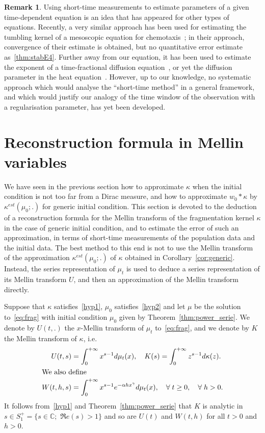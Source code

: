 \documentclass[10pt]{amsart}
\theoremstyle{definition}\newtheorem{defi}[theo]{Definition}\newtheorem{rema}[theo]{Remark}\newtheorem{exam}[theo]{Example}\newtheorem{exem}[theo]{Example}\newtheorem{nota}[theo]{Notation}
\newcommand*\dst{\displaystyle}
\newcommand*\C{\mathbb{C}}
\let\oldforall\forall
\renewcommand*{\forall}{\mathrel{\oldforall}}
\begin{document}
\begin{rema}
Using short-time measurements to estimate parameters of a given time-dependent equation is an idea that has appeared for other types of equations. Recently, a very similar approach has been used for estimating the tumbling kernel of a mesoscopic equation for chemotaxis~\cite{hellmuth2022kinetic}; in their approach, convergence of their estimate is obtained, but no quantitative error estimate as~\eqref{thm:stabE4}. Further away from our equation, it has been used to estimate the exponent of a time-fractional diffusion equation~\cite{li2019inverse}, or yet the diffusion parameter in the heat equation~\cite{cao2006natural}. However, up to our knowledge, no systematic approach which would analyse the ``short-time method'' in a general framework, and which would justify our analogy of the time window of the observation with a regularisation parameter, has yet been developed.
\end{rema}



\section{Reconstruction formula in Mellin variables}\label{sec:reco}
We have seen in the previous section how to approximate $\kappa$ when the initial condition is not too far from a Dirac measure, and how to approximate $w_0 * \kappa$ by $\kappa^{est}(\mu _0;.)$ for generic initial condition. This section is devoted to the deduction of a reconstruction formula for the Mellin transform of the fragmentation kernel $\kappa$ in the case of generic initial condition, and to estimate the error of such an approximation, in terms of short-time measurements of the population data and the initial data. The best method to this end is not to use the Mellin transform of the approximation $\kappa^{est}(\mu_0;.)$ of $\kappa$ obtained in Corollary~\ref{cor:generic}. Instead, the series representation of $\mu_t$ is used to deduce a series representation of its Mellin transform $U$, and then an approximation of the Mellin transform directly.

Suppose that $\kappa $ satisfies~\eqref{hyp1}, $\mu _0$ satisfies~\eqref{hyp2} and let $\mu $ be the solution to~\eqref{eq:frag} with initial condition $\mu_0$ given by Theorem~\ref{thm:power_serie}. We denote by $U(t,.)$ the $x$-Mellin transform of $\mu_t$ to~\eqref{eq:frag}, and we denote by $K$ the Mellin transform of $\kappa$, i.e.
\begin{align*}
U(t,s) &= \dst\int_0^{+\infty} x^{s-1} d\mu_t(x), \quad K(s)= \dst\int_0^{+\infty} z^{s-1} d\kappa(z).
\\
\intertext{We also define}
W(t,h,s) &= \dst\int_0^{+\infty} x^{s-1}e^{-\alpha h x^{\gamma}} d\mu_t(x),\quad\forall t\geq0,\quad\forall h> 0.
\end{align*}
It follows from~\eqref{hyp1} and Theorem~\ref{thm:power_serie} that $K$ is analytic in $s\in S_1^+= \{s\in \C;\,\,\Re e(s)> 1\}$ and so are $U(t)$ and $W(t, h)$ for all $t>0$ and $h>0$.
\end{document}

